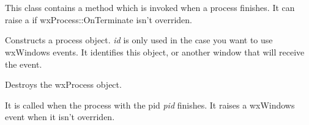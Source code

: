 \section{}\label{wxprocess}

This class contains a method which is invoked when a process finishes.
It can raise a  if wxProcess::OnTerminate
isn't overriden.




\label{wxprocessconstr}


Constructs a process object. {\it id} is only used in the case you want to
use wxWindows events. It identifies this object, or another window that will
receive the event.






Destroys the wxProcess object.

\label{wxprocessonterminate}


It is called when the process with the pid {\it pid} finishes.
It raises a wxWindows event when it isn't overriden.



